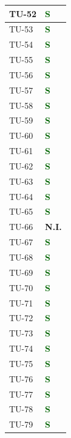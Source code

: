 \begin{longtable}{|C{2.5cm}|C{2.5cm}|}
	\hline
	{TU-52} & \textcolor{darkgreen}{\textbf{S}}\\
	\hline
	{TU-53} & \textcolor{darkgreen}{\textbf{S}}\\
	\hline
	{TU-54} & \textcolor{darkgreen}{\textbf{S}}\\
	\hline
	{TU-55} & \textcolor{darkgreen}{\textbf{S}}\\
	\hline
	{TU-56} & \textcolor{darkgreen}{\textbf{S}}\\
	\hline
	{TU-57} & \textcolor{darkgreen}{\textbf{S}}\\
	\hline
	{TU-58} & \textcolor{darkgreen}{\textbf{S}}\\
	\hline
	{TU-59} & \textcolor{darkgreen}{\textbf{S}}\\
	\hline
	{TU-60} & \textcolor{darkgreen}{\textbf{S}}\\
	\hline
	{TU-61} & \textcolor{darkgreen}{\textbf{S}}\\
	\hline
	{TU-62} & \textcolor{darkgreen}{\textbf{S}}\\
	\hline
	{TU-63} & \textcolor{darkgreen}{\textbf{S}}\\
	\hline
	{TU-64} & \textcolor{darkgreen}{\textbf{S}}\\
	\hline
	{TU-65} & \textcolor{darkgreen}{\textbf{S}}\\
	\hline
	{TU-66} & {\textbf{N.I.}}\\
	\hline
	{TU-67} & \textcolor{darkgreen}{\textbf{S}}\\
	\hline
	{TU-68} & \textcolor{darkgreen}{\textbf{S}}\\
	\hline
	{TU-69} & \textcolor{darkgreen}{\textbf{S}}\\
	\hline
	{TU-70} & \textcolor{darkgreen}{\textbf{S}}\\
	\hline
	{TU-71} & \textcolor{darkgreen}{\textbf{S}}\\
	\hline
	{TU-72} & \textcolor{darkgreen}{\textbf{S}}\\
	\hline
	{TU-73} & \textcolor{darkgreen}{\textbf{S}}\\
	\hline
	{TU-74} & \textcolor{darkgreen}{\textbf{S}}\\
	\hline
	{TU-75} & \textcolor{darkgreen}{\textbf{S}}\\
	\hline
	{TU-76} & \textcolor{darkgreen}{\textbf{S}}\\
	\hline
	{TU-77} & \textcolor{darkgreen}{\textbf{S}}\\
	\hline
	{TU-78} & \textcolor{darkgreen}{\textbf{S}}\\
	\hline
	{TU-79} & \textcolor{darkgreen}{\textbf{S}}\\

\end{longtable}
